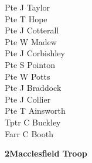 \begin{multicols}{2}
  Pte J Taylor \\
  Pte T Hope \\
  Pte J Cotterall \\
  Pte W Madew \\
  Pte J Corbishley \\
  Pte S Pointon \\
  Pte W Potts \\
  Pte J Braddock \\
  Pte J Collier \\
  Pte T Ainsworth \\
  Tptr C Buckley \\
  Farr C Booth \\
\end{multicols}

\vspace*{10mm}

\begin{center}
  \Large
  \textbf{2\nd Macclesfield Troop}
\end{center}

\vspace*{10mm}

